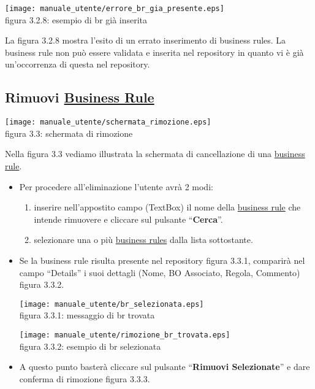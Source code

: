 \begin{center}
\texttt{[image: manuale\_utente/errore\_br\_gia\_presente.eps]}\\
 figura 3.2.8: esempio di br gi\`a inserita
\end{center} 
La figura 3.2.8 mostra l'esito di un errato inserimento di business rules. La business rule non pu\`o essere validata e inserita nel repository in quanto vi \`e gi\`a un'occorrenza di questa nel repository.

\subsection{Rimuovi \underline{Business Rule}}
\begin{center}
\texttt{[image: manuale\_utente/schermata\_rimozione.eps]}\\
 figura 3.3: schermata di rimozione
\end{center}
Nella figura 3.3 vediamo illustrata la schermata di cancellazione di una \underline{business rule}.
\begin{itemize}
\item Per procedere all'eliminazione l'utente avr\`a 2 modi:
\begin{enumerate}
\item inserire nell'appostito campo (TextBox) il nome della \underline{business rule} che intende rimuovere e cliccare sul pulsante ``\textbf{Cerca}''.
\item selezionare una o pi\`u \underline{business rules} dalla lista sottostante.
\end{enumerate}

\item Se la business rule risulta presente nel repository figura 3.3.1, comparir\`a  nel campo ``Details'' i suoi dettagli (Nome, BO Associato, Regola, Commento) figura 3.3.2. 

\begin{center}
\texttt{[image: manuale\_utente/br\_selezionata.eps]}\\
 figura 3.3.1: messaggio di br trovata
\end{center} 

\begin{center}
\texttt{[image: manuale\_utente/rimozione\_br\_trovata.eps]}\\
 figura 3.3.2: esempio di br selezionata
\end{center} 

\item A questo punto baster\`a cliccare sul pulsante ``\textbf{Rimuovi Selezionate}'' e dare conferma di rimozione figura 3.3.3.  
\end{itemize}

